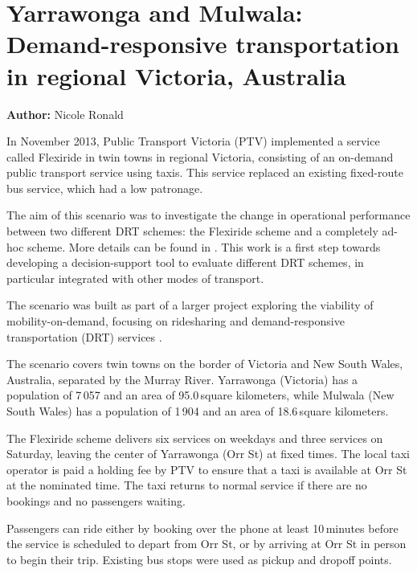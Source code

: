 \section{Yarrawonga and Mulwala: Demand-responsive transportation in regional Victoria, Australia}
\label{sec:yarrawonga}
\hfill \textbf{Author:} Nicole Ronald

In November 2013, Public Transport Victoria (PTV) implemented a service called
Flexiride in twin towns in regional Victoria, consisting of an on-demand public
transport service using taxis. This service replaced an existing fixed-route bus
service, which had a low patronage.

The aim of this scenario was to investigate the change in operational
performance between two different DRT schemes: the Flexiride scheme and a
completely ad-hoc scheme. More details can be found in
\citep[][]{RonThoWin2015}. This work is a first step towards developing a
decision-support tool to evaluate different DRT schemes, in particular
integrated with other modes of transport. 

The scenario was built as part of a larger project exploring the viability of
mobility-on-demand, focusing on ridesharing and demand-responsive transportation
(DRT) services \citep[][]{Ronald_iMoD_2014}.

The scenario covers twin towns on the border of Victoria and New South Wales,
Australia, separated by the Murray River. Yarrawonga (Victoria) has a population
of 7\,057 and an area of 95.0\,square kilometers, while Mulwala (New South Wales) has a
population of 1\,904 and an area of 18.6\,square kilometers. 

The Flexiride scheme delivers six services on weekdays and three services on
Saturday, leaving the center of Yarrawonga (Orr St) at fixed times.  The local
taxi operator is paid a holding fee by PTV to ensure that a taxi is available at
Orr St at the nominated time. The taxi returns to normal service if there are no
bookings and no passengers waiting.

Passengers can ride either by booking over the phone at least 10\,minutes before
the service is scheduled to depart from Orr St, or by arriving at Orr St in
person to begin their trip. Existing bus stops were used as pickup and dropoff
points.

